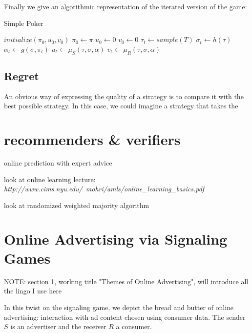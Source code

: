 \documentclass{article}
\begin{document}
Finally we give an algorithmic representation of the iterated version of the game:
\begin{algorithm}
	\caption{Simple Poker}\label{simplepokeralgo}
	\begin{algorithmic}[1]
	\STATE $initialize(\pi_0, u_0, v_0)$
	\STATE $\pi_0 \leftarrow \pi$
	\STATE $u_0 \leftarrow 0$
	\STATE $v_0 \leftarrow 0$
		\STATE $\tau_t \leftarrow sample(T)$
		\STATE $\sigma_t \leftarrow h(\tau)$
		\STATE $\alpha_t \leftarrow g(\sigma, \pi_t)$
		\STATE $u_t \leftarrow \mu_S(\tau, \sigma, \alpha)$
		\STATE $v_t \leftarrow \mu_R(\tau, \sigma, \alpha)$
	\ENDFOR
	\end{algorithmic}
\end{algorithm}

\subsection{Regret}

An obvious way of expressing the quality of a strategy is to compare it with the best possible strategy. In this case, we could imagine a strategy that takes the 

\newpage

\section{recommenders \& verifiers}

online prediction with expert advice

look at online learning lecture: \emph{http://www.cims.nyu.edu/~mohri/amls/online\_learning\_basics.pdf}

look at randomized weighted majority algorithm

\section{Online Advertising via Signaling Games}

NOTE: section 1, working title "Themes of Online Advertising", will introduce all the lingo I use here

In this twist on the signaling game, we depict the bread and butter of online advertising: interaction with ad content chosen using consumer data. The sender $S$ is an advertiser and the receiver $R$ a consumer.
\end{document}
